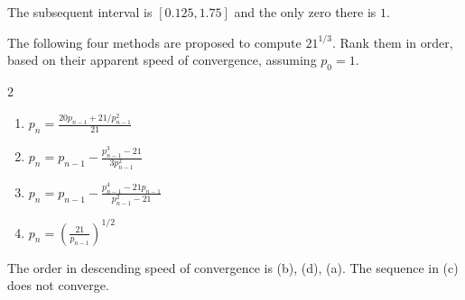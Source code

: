 \begin{posttest}
\begin{mysolution}
\begin{enumerate}[label=(\alph*)]
The subsequent interval is $[0.125,1.75]$ and the only zero there is $1$.
\end{enumerate}
\end{mysolution}

\item The following four methods are proposed to compute $21^{1/3}$. Rank them in order, based on their
 apparent speed of convergence, assuming $p_0=1$.
\begin{multicols}{2}
 \begin{enumerate}[label=(\alph*)]
\item $p_n=\frac{20p_{n-1}+21/p_{n-1}^2}{21}$
\item $p_n=p_{n-1}-\frac{p_{n-1}^3-21}{3p_{n-1}^2}$
\item $p_n=p_{n-1}-\frac{p_{n-1}^4-21p_{n-1}}{p_{n-1}^2-21}$
\item $p_n=\left(\frac{21}{p_{n-1}}\right)^{1/2}$
\end{enumerate}
\end{multicols}

\begin{mysolution}
The order in descending speed of convergence is (b), (d), (a). The sequence in (c) does not converge.
\end{mysolution}
\end{posttest}


